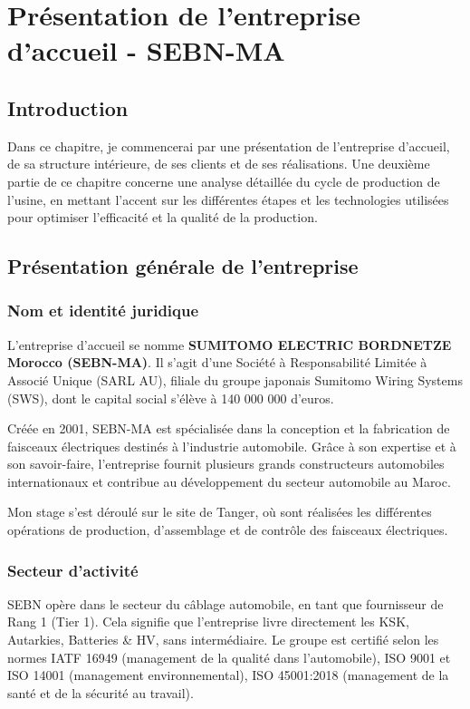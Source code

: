 \chapter{Présentation de l'entreprise d'accueil - SEBN-MA}
\label{chap:presentation_entreprise}

\section*{Introduction}
Dans ce chapitre, je commencerai par une présentation de l'entreprise d'accueil, de sa structure intérieure, de ses clients et de ses réalisations. Une deuxième partie de ce chapitre concerne une analyse détaillée du cycle de production de l'usine, en mettant l'accent sur les différentes étapes et les technologies utilisées pour optimiser l'efficacité et la qualité de la production.

\section{Présentation générale de l'entreprise}

\subsection{Nom et identité juridique}
L'entreprise d'accueil se nomme \textbf{SUMITOMO ELECTRIC BORDNETZE Morocco (SEBN-MA)}. Il s'agit d'une Société à Responsabilité Limitée à Associé Unique (SARL AU), filiale du groupe japonais Sumitomo Wiring Systems (SWS), dont le capital social s'élève à 140 000 000 d'euros.

Créée en 2001, SEBN-MA est spécialisée dans la conception et la fabrication de faisceaux électriques destinés à l'industrie automobile. Grâce à son expertise et à son savoir-faire, l'entreprise fournit plusieurs grands constructeurs automobiles internationaux et contribue au développement du secteur automobile au Maroc.

Mon stage s'est déroulé sur le site de Tanger, où sont réalisées les différentes opérations de production, d'assemblage et de contrôle des faisceaux électriques.

\subsection{Secteur d'activité}
SEBN opère dans le secteur du câblage automobile, en tant que fournisseur de Rang 1 (Tier 1). Cela signifie que l'entreprise livre directement les KSK, Autarkies, Batteries \& HV, sans intermédiaire. Le groupe est certifié selon les normes IATF 16949 (management de la qualité dans l'automobile), ISO 9001 et ISO 14001 (management environnemental), ISO 45001:2018 (management de la santé et de la sécurité au travail).

